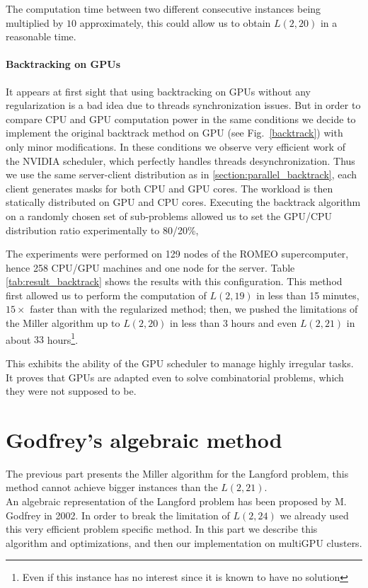The computation time between two different consecutive instances being multiplied by $10$ approximately, this could allow us to obtain $L(2,20)$ in a reasonable time.


\paragraph{Backtracking on GPUs}

It appears at first sight that using backtracking on GPUs without any regularization is a bad idea due to threads synchronization issues.
But in order to compare CPU and GPU computation power in the same conditions we decide to implement the original backtrack method on GPU (see Fig.~\ref{backtrack}) with only minor modifications.
In these conditions we observe very efficient work of the NVIDIA scheduler, which perfectly handles threads desynchronization.
Thus we use the same server-client distribution as in \ref{section:parallel_backtrack}, each client generates masks for both CPU and GPU cores. 
The workload is then statically distributed on GPU and CPU cores.
Executing the backtrack algorithm on a randomly chosen set of sub-problems allowed us to set the GPU/CPU distribution ratio experimentally to 80/20\%, 

The experiments were performed on 129 nodes of the ROMEO supercomputer, hence 258 CPU/GPU machines and one node for the server. 
Table \ref{tab:result_backtrack} shows the results with this configuration. 
This method first allowed us to perform the computation of $L(2,19)$ in less than 15 minutes, $15\times$ faster than with the regularized method; then, we pushed the limitations of the Miller algorithm up to $L(2,20)$ in less than 3 hours and even $L(2,21)$ in about $33$ hours\footnote{Even if this instance has no interest since it is known to have no solution}.

This exhibits the ability of the GPU scheduler to manage highly irregular tasks. It proves that GPUs are adapted even to solve combinatorial problems, which they were not supposed to be.

\section{Godfrey's algebraic method}
The previous part presents the Miller algorithm for the Langford problem, this method cannot achieve bigger instances than the $L(2,21)$.\\
An algebraic representation of the Langford problem has been proposed by M. Godfrey in 2002.
In order to break the limitation of $L(2,24)$ we already used this very efficient problem specific method.
In this part we describe this algorithm and optimizations, and then our implementation on multiGPU clusters.
